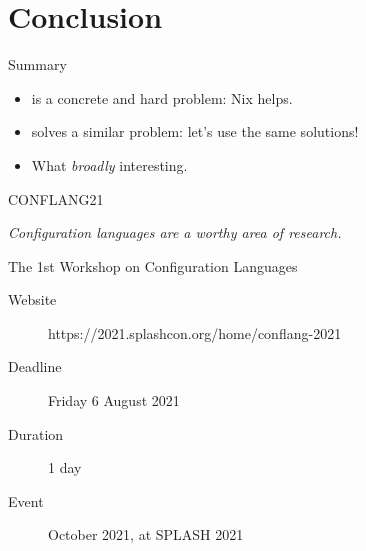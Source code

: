 \documentclass[t, aspectratio=169]{beamer}
\newcommand{\couleur}[2]{{\color{#1}{#2}}}
\begin{document}
\section{Conclusion}

\begin{frame}{Summary}
    \begin{itemize}
        \item \couleur{orange-vivid-tangerine}{Reproducibility} is a concrete
            and hard problem: Nix helps.
        \item \couleur{orange-vivid-tangerine}{Functional programming} solves
            a similar problem: let's use the same solutions!
        \item What
            \emph{broadly} interesting.
    \end{itemize}
\end{frame}

\begin{frame}{CONFLANG21}

    \begin{center}
        \textit{Configuration languages are a worthy area of research.}
    \end{center}

    The 1st Workshop on Configuration Languages

    \begin{description}
        \item[Website] https://2021.splashcon.org/home/conflang-2021
        \item[Deadline] Friday 6 August 2021
        \item[Duration] 1 day
        \item[Event] October 2021, at SPLASH 2021
    \end{description}
\end{frame}
\end{document}
